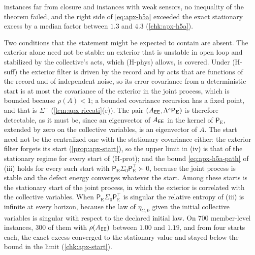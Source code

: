 instances far from closure and instances with weak sensors, no inequality of the theorem failed, and the right side of \eqref{eq:apx-h5a} exceeded the exact stationary excess by a median factor between $1.3$ and $4.3$ (\cref{chk:apx-h5a}).

Two conditions that the statement might be expected to contain are absent. The exterior alone need not be stable: an exterior that is unstable in open loop and stabilized by the collective's acts, which (H-phys) allows, is covered. Under (H-suff) the exterior filter is driven by the record and by acts that are functions of the record and of independent noise, so its error covariance from a deterministic start is at most the covariance of the exterior in the joint process, which is bounded because $\rho(A)<1$; a bounded covariance recursion has a fixed point, and that is $\Sigma^-$ (\cref{lem:apx-riccati}(e)). The pair $(A_{\mathsf{E}\mathsf{E}},\Lambda^s\mathsf P_{\mathrm E})$ is therefore detectable, as it must be, since an eigenvector of $A_{\mathsf{E}\mathsf{E}}$ in the kernel of $\mathsf P_{\mathrm E}$, extended by zero on the collective variables, is an eigenvector of $A$. The start need not be the centralized one with the stationary covariance either: the exterior filter forgets its start (\cref{prop:apx-start}), so the upper limit in (iv) is that of the stationary regime for every start of (H-prot); and the bound \eqref{eq:apx-h5a-path} of (iii) holds for every such start with $\mathsf P_{\mathrm E}\Sigma_0\mathsf P_{\mathrm E}^\top\succ0$, because the joint process is stable and the defect energy converges whatever the start. Among these starts is the stationary start of the joint process, in which the exterior is correlated with the collective variables. When $\mathsf P_{\mathrm E}\Sigma_0\mathsf P_{\mathrm E}^\top$ is singular the relative entropy of (iii) is infinite at every horizon, because the law of $\eta_{C,0}$ given the initial collective variables is singular with respect to the declared initial law. On $700$ member-level instances, $300$ of them with $\rho(A_{\mathsf{E}\mathsf{E}})$ between $1.00$ and $1.19$, and from four starts each, the exact excess converged to the stationary value and stayed below the bound in the limit (\cref{chk:apx-start}).

